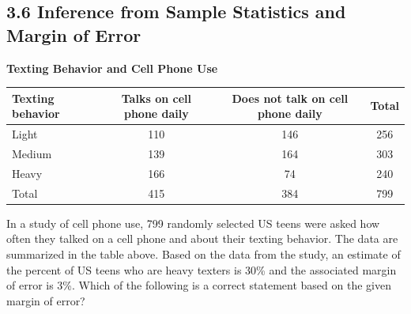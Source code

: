 \subsection*{3.6 Inference from Sample Statistics and Margin of Error }

\vspace{0.5em}

\setcounter{questionnum}{0}


\noindent\markforreview

\begin{center}
    

\textbf{Texting Behavior and Cell Phone Use}

\vspace{0.4em}

\begin{tabular}{|l|c|c|c|}
\hline
Texting behavior & Talks on cell phone daily & Does not talk on cell phone daily & Total \\
\hline
Light & 110 & 146 & 256 \\
Medium & 139 & 164 & 303 \\
Heavy & 166 & 74 & 240 \\
\hline
Total & 415 & 384 & 799 \\
\hline
\end{tabular}
\end{center}

\vspace{1em}

In a study of cell phone use, 799 randomly selected US teens were asked how often they talked on a cell phone and about their texting behavior.  
The data are summarized in the table above.  
Based on the data from the study, an estimate of the percent of US teens who are heavy texters is 30\% and the associated margin of error is 3\%.  
Which of the following is a correct statement based on the given margin of error?

\vspace{0.75em}


\vspace{2em}


